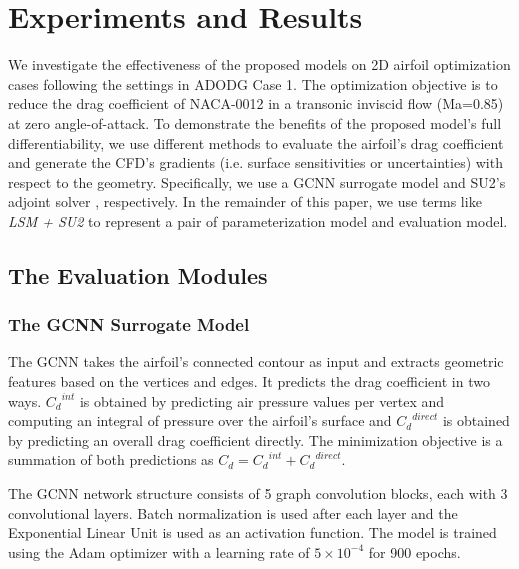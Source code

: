 \section{Experiments and Results}
\label{ch4:sec:final_exp_res}
We investigate the effectiveness of the proposed models on 2D airfoil optimization cases following the settings in ADODG Case 1. The optimization objective is to reduce the drag coefficient of NACA-0012 in a transonic inviscid flow (Ma=0.85) at zero angle-of-attack. To demonstrate the benefits of the proposed model's full differentiability, we use different methods to evaluate the airfoil's drag coefficient and generate the CFD's gradients (i.e. surface sensitivities or uncertainties) with respect to the geometry. Specifically, we use a GCNN \cite{aa.Baque2018} surrogate model and SU2's adjoint solver \cite{aa.Economon2016}, respectively.
In the remainder of this paper, we use terms like \textit{LSM + SU2} to represent a pair of parameterization model and evaluation model.

\subsection{The Evaluation Modules}
\subsubsection{The GCNN Surrogate Model}
The GCNN takes the airfoil's connected contour as input and extracts geometric features based on the vertices and edges. It predicts the drag coefficient in two ways. ${C_d}^{int}$ is obtained by predicting air pressure values per vertex and computing an integral of pressure over the airfoil's surface and ${C_d}^{direct}$ is obtained by predicting an overall drag coefficient directly. The minimization objective is a summation of both predictions as $C_d = {C_d}^{int} + {C_d}^{direct}$.

The GCNN network structure consists of 5 graph convolution blocks, each with 3 convolutional layers. Batch normalization \cite{ai.Ioffe2015} is used after each layer and the Exponential Linear Unit \cite{ai.Clevert2015} is used as an activation function. The model is trained using the Adam optimizer with a learning rate of $5 \times 10^{-4}$ for 900 epochs.

